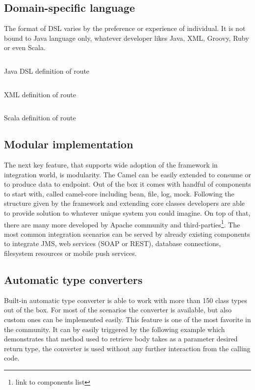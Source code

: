 \documentclass[12pt,final,oneside]{fithesis2}
\begin{document}
\subsection*{Domain-specific language}
The format of DSL varies by the preference or experience of individual. It is not bound to Java language only, whatever developer likes Java, XML, Groovy, Ruby or even Scala.

\begin{listing}[ht]
	\inputminted[]{java}{sources/java_dsl_example.java}
	\caption{Java DSL definition of route}

\end{listing}

\begin{listing}[ht]
	\inputminted[]{xml}{sources/xml_example.xml}
	\caption{XML definition of route }

\end{listing}

\begin{listing}[ht]
	\inputminted[]{java}{sources/scala_example.java}
	\caption{Scala definition of route }

\end{listing}

\subsection*{Modular implementation}
The next key feature, that supports wide adoption of the framework in integration world, is modularity. The Camel can be easily extended to  consume or to produce data to endpoint. Out of the box it comes with handful of components to start with, called camel-core including bean, file, log, mock. Following the structure given by the framework and extending core classes developers are able to provide solution to whatever unique system you could imagine. On top of that, there are many more developed by Apache community and third-parties\footnote{link to components list}. The most common integration scenarios can be served by already existing components to integrate JMS, web services (SOAP or REST), database connections, filesystem resources or mobile push services.

\subsection*{Automatic type converters}
Built-in automatic type converter is able to work with more than 150 class types out of the box. For most of the scenarios the converter is available, but also custom ones can be implemented easily. This feature is one of the most favorite in the community. It can by easily triggered by the following example which demonstrates that method used to retrieve body takes as a parameter desired return type, the converter is used without any further interaction from the calling code.
\end{document}
